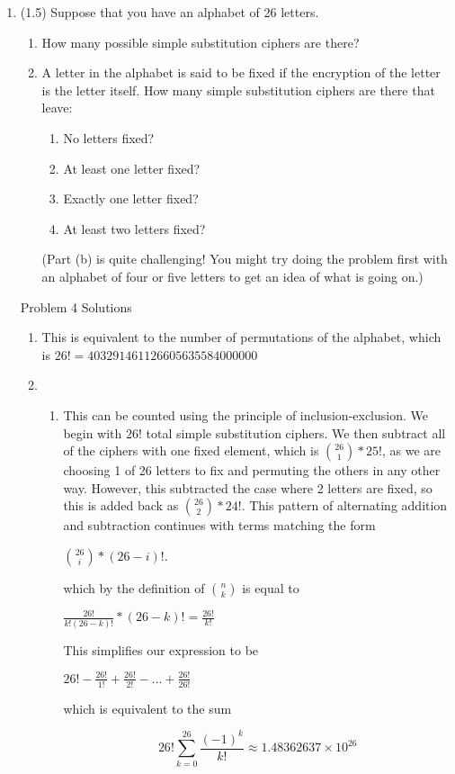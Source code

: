 \documentclass[12pt]{amsart}
\theoremstyle{definition}
\begin{document}
\begin{enumerate}
		
	\item (1.5) Suppose that you have an alphabet of 26 letters.
		\begin{enumerate}
			\item  How many possible simple substitution ciphers are there?
			\item  A letter in the alphabet is said to be fixed if the encryption of the letter is the
				letter itself. How many simple substitution ciphers are there that leave:
			\begin{enumerate}
				\item No letters fixed?
				\item At least one letter fixed?
				\item Exactly one letter fixed?
				\item At least two letters fixed?
			\end{enumerate}
			(Part (b) is quite challenging! You might try doing the problem first with an alphabet 
			of four or five letters to get an idea of what is going on.)
		\end{enumerate}
            Problem 4 Solutions
            \begin{enumerate}
                \item This is equivalent to the number of permutations of the alphabet, which is $26! = 403291461126605635584000000$
                \item
                \begin{enumerate}
                    \item This can be counted using the principle of inclusion-exclusion. We begin with $26!$ total simple substitution ciphers. We then subtract all of the ciphers with one fixed element, which is ${26\choose1} * 25!$, as we are choosing 1 of 26 letters to fix and permuting the others in any other way. However, this subtracted the case where 2 letters are fixed, so this is added back as ${26 \choose 2} * 24!$. This pattern of alternating addition and subtraction continues with terms matching the form
                    \begin{center}
                        ${26 \choose i} * (26 - i)!$.
                    \end{center}
                    which by the definition of $n \choose k$ is equal to
                    \begin{center}
                        ${\frac{26!}{k! (26 - k)!} * (26 - k)!} = \frac{26!}{k!}$
                    \end{center}
                    This simplifies our expression to be
                    \begin{center}
                        $26! - \frac{26!}{1!} + \frac{26!}{2!} - \dots + \frac{26!}{26!}$
                    \end{center}
                    which is equivalent to the sum
                    \begin{center}
                         \[ 26! \sum_{k=0}^{26} \frac{(-1)^k}{k!} \approx 1.48362637\times10^{26} \]
                    \end{center}


\end{enumerate}
\end{enumerate}
\end{enumerate}
\end{document}
